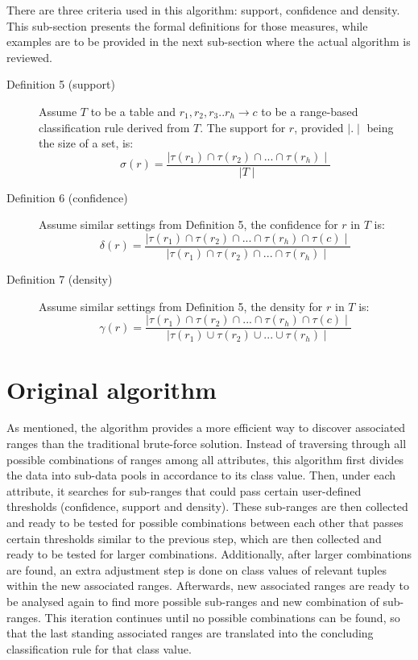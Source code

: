 There are three criteria used in this algorithm: support, confidence and density. This sub-section presents the formal definitions for those measures, while examples are to be provided in the next sub-section where the actual algorithm is reviewed.

\begin{description}
\item[Definition 5 (support)]
Assume $T$ to be a table and $r_1, r_2, r_3..r_h \rightarrow c$ to be a range-based classification rule derived from $T$. The support for $r$, provided $\mid . \mid$ being the size of a set, is: 
\[ \sigma(r) = \frac{\mid \tau(r_1) \cap \tau(r_2) \cap ... \cap \tau(r_h) \mid}{\mid T \mid} \] 

\item[Definition 6 (confidence)]
Assume similar settings from Definition 5, the confidence for $r$  in $T$ is:
\[ \delta(r) = \frac{\mid \tau(r_1) \cap \tau(r_2) \cap ... \cap \tau(r_h) \cap \tau(c) \mid}{\mid \tau(r_1) \cap \tau(r_2) \cap ... \cap \tau(r_h) \mid} \] 

\item[Definition 7 (density)]
Assume similar settings from Definition 5, the density for $r$ in $T$ is:
\[ \gamma(r) = \frac{\mid \tau(r_1) \cap \tau(r_2) \cap ... \cap \tau(r_h) \cap \tau(c) \mid}{\mid \tau(r_1) \cup \tau(r_2) \cup ... \cup \tau(r_h) \mid} \] 

\end{description}

\section{Original algorithm}

As mentioned, the algorithm provides a more efficient way to discover associated ranges than the traditional brute-force solution. Instead of traversing through all possible combinations of ranges among all attributes, this algorithm first divides the data into sub-data pools in accordance to its class value. Then, under each attribute, it searches for sub-ranges that could pass certain user-defined thresholds (confidence, support and density). These sub-ranges are then collected and ready to be tested for possible combinations between each other that passes certain thresholds similar to the previous step, which are then collected and ready to be tested for larger combinations. Additionally, after larger combinations are found, an extra adjustment step is done on class values of relevant tuples within the new associated ranges. Afterwards, new associated ranges are ready to be analysed again to find more possible sub-ranges and new combination of sub-ranges. This iteration continues until no possible combinations can be found, so that the last standing associated ranges are translated into the concluding classification rule for that class value. 

